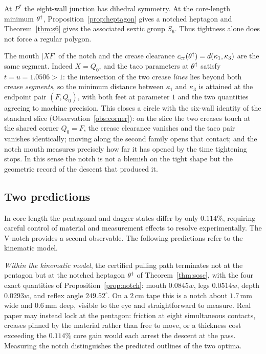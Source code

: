 \begin{remark}\label{rem:flushness}
At $P^*$ the eight-wall junction has dihedral symmetry. At the core-length minimum $\theta^\dagger$, Proposition~\ref{prop:heptagon} gives a notched heptagon and Theorem~\ref{thm:s6} gives the associated sextic group $S_6$. Thus tightness alone does not force a regular polygon.
\end{remark}

\begin{remark}\label{rem:mouth-clearance}
The mouth $|XF|$ of the notch and the crease clearance $c_{\mathrm{cr}}(\theta^\dagger)=d(\kappa_1,\kappa_3)$ are the same segment. Indeed $X=Q_0$, and the taco parameters at $\theta^\dagger$ satisfy $t=u=1.0506>1$: the intersection of the two crease \emph{lines} lies beyond both crease \emph{segments}, so the minimum distance between $\kappa_1$ and $\kappa_3$ is attained at the endpoint pair $(F,Q_0)$, with both feet at parameter $1$ and the two quantities agreeing to machine precision. This closes a circle with the six-wall identity of the standard slice (Observation~\ref{obs:corner}): on the slice the two creases touch at the shared corner $Q_0=F$, the crease clearance vanishes and the taco pair vanishes identically; moving along the second family opens that contact; and the notch mouth measures precisely how far it has opened by the time tightening stops. In this sense the notch is not a blemish on the tight shape but the geometric record of the descent that produced it.
\end{remark}

\subsection{Two predictions}
In core length the pentagonal and dagger states differ by only $0.114\%$, requiring careful control of material and measurement effects to resolve experimentally. The V-notch provides a second observable. The following predictions refer to the kinematic model.

\begin{remark}\label{rem:pred-notch}
\emph{Within the kinematic model}, the certified pulling path terminates not at the pentagon but at the notched heptagon $\theta^\dagger$ of Theorem~\ref{thm:sosc}, with the four exact quantities of Proposition~\ref{prop:notch}: mouth $0.0845w$, legs $0.0514w$, depth $0.0293w$, and reflex angle $249.52^\circ$. On a $2\,\mathrm{cm}$ tape this is a notch about $1.7\,\mathrm{mm}$ wide and $0.6\,\mathrm{mm}$ deep, visible to the eye and straightforward to measure. Real paper may instead lock at the pentagon: friction at eight simultaneous contacts, creases pinned by the material rather than free to move, or a thickness cost exceeding the $0.114\%$ core gain would each arrest the descent at the pass. Measuring the notch distinguishes the predicted outlines of the two optima.
\end{remark}

